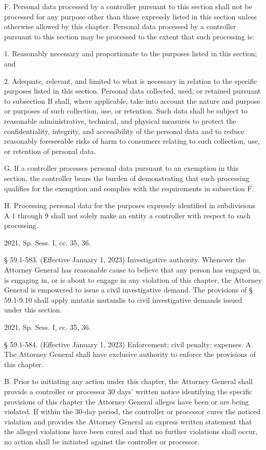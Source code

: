 F. Personal data processed by a controller pursuant to this section shall not be processed for any purpose other than those expressly listed in this section unless otherwise allowed by this chapter. Personal data processed by a controller pursuant to this section may be processed to the extent that such processing is:

1. Reasonably necessary and proportionate to the purposes listed in this section; and

2. Adequate, relevant, and limited to what is necessary in relation to the specific purposes listed in this section. Personal data collected, used, or retained pursuant to subsection B shall, where applicable, take into account the nature and purpose or purposes of such collection, use, or retention. Such data shall be subject to reasonable administrative, technical, and physical measures to protect the confidentiality, integrity, and accessibility of the personal data and to reduce reasonably foreseeable risks of harm to consumers relating to such collection, use, or retention of personal data.

G. If a controller processes personal data pursuant to an exemption in this section, the controller bears the burden of demonstrating that such processing qualifies for the exemption and complies with the requirements in subsection F.

H. Processing personal data for the purposes expressly identified in subdivisions A 1 through 9 shall not solely make an entity a controller with respect to such processing.

2021, Sp. Sess. I, cc. 35, 36.

§ 59.1-583. (Effective January 1, 2023) Investigative authority.
Whenever the Attorney General has reasonable cause to believe that any person has engaged in, is engaging in, or is about to engage in any violation of this chapter, the Attorney General is empowered to issue a civil investigative demand. The provisions of § 59.1-9.10 shall apply mutatis mutandis to civil investigative demands issued under this section.

2021, Sp. Sess. I, cc. 35, 36.

§ 59.1-584. (Effective January 1, 2023) Enforcement; civil penalty; expenses.
A. The Attorney General shall have exclusive authority to enforce the provisions of this chapter.

B. Prior to initiating any action under this chapter, the Attorney General shall provide a controller or processor 30 days' written notice identifying the specific provisions of this chapter the Attorney General alleges have been or are being violated. If within the 30-day period, the controller or processor cures the noticed violation and provides the Attorney General an express written statement that the alleged violations have been cured and that no further violations shall occur, no action shall be initiated against the controller or processor.

